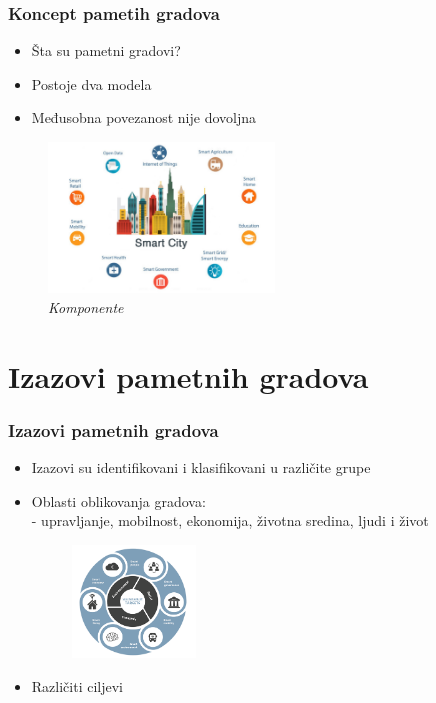 \documentclass{beamer}
\begin{document}
\begin{frame}[fragile]\frametitle{Koncept pametih gradova}
	\begin{itemize}	
		 \item{Šta su pametni gradovi?} 
          \item{Postoje dva modela}
         \item{Međusobna povezanost nije dovoljna}

	\end{itemize}
   \begin{figure}[h!]
        \centering\includegraphics[height=4cm]{concept.jpg} 
        \caption{\emph{Komponente}}
        \label{fig:Komponente}
\end{figure}
\end{frame}

\section{Izazovi pametnih gradova}
\begin{frame}[fragile]\frametitle{Izazovi pametnih gradova}
\begin{itemize}
    \item Izazovi su identifikovani i klasifikovani u različite grupe
    \item Oblasti oblikovanja gradova:   \\
    - upravljanje, mobilnost, ekonomija, životna sredina, ljudi i život
    \begin{figure}[h!]
        \centering\includegraphics[height=3cm]{Picture1.png} 
\end{figure}
    \item Različiti ciljevi
\end{itemize}

\end{frame}
\end{document}

